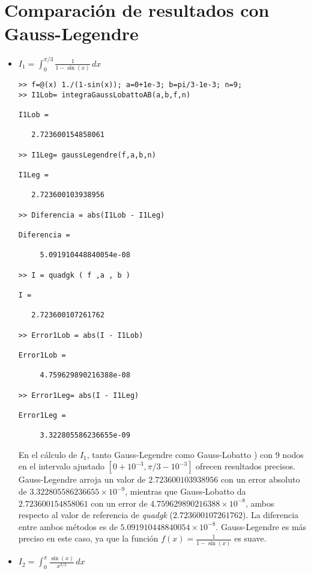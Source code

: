 \documentclass[a4paper]{article}
\begin{document}
\section{Comparación de resultados con Gauss-Legendre}
\begin{itemize}

    \item $\displaystyle I_1=\int_{0}^{\pi/3} \! \frac{1}{1-\sin(x)}  \,dx$
    \\
    \begin{lstlisting}[frame=single, style=Matlab-Pyglike]
>> f=@(x) 1./(1-sin(x)); a=0+1e-3; b=pi/3-1e-3; n=9;
>> I1Lob= integraGaussLobattoAB(a,b,f,n)

I1Lob =

   2.723600154858061

>> I1Leg= gaussLegendre(f,a,b,n)

I1Leg =

   2.723600103938956

>> Diferencia = abs(I1Lob - I1Leg)

Diferencia =

     5.091910448840054e-08

>> I = quadgk ( f ,a , b )

I =

   2.723600107261762

>> Error1Lob = abs(I - I1Lob)

Error1Lob =

     4.759629890216388e-08

>> Error1Leg= abs(I - I1Leg)

Error1Leg =

     3.322805586236655e-09

    \end{lstlisting}

En el cálculo de \( I_1 \), tanto Gauss-Legendre como Gauss-Lobatto ) con 9 nodos en el intervalo ajustado \( [0 + 10^{-3}, \pi/3 - 10^{-3}] \) ofrecen resultados precisos. Gauss-Legendre arroja un valor de \( 2.723600103938956 \) con un error absoluto de \( 3.322805586236655 \times 10^{-9} \), mientras que Gauss-Lobatto da \( 2.723600154858061 \) con un error de \( 4.759629890216388 \times 10^{-8} \), ambos respecto al valor de referencia de \textit{quadgk} (\( 2.723600107261762 \)). La diferencia entre ambos métodos es de \( 5.091910448840054 \times 10^{-8} \). Gauss-Legendre es más preciso en este caso, ya que la función \( f(x) = \frac{1}{1-\sin(x)} \) es suave.
\\
    \item $\displaystyle I_2=\int_{0}^{\pi} \! \frac{\sin(x)}{x^{3/2}}  \,dx$
    \\
    \begin{itemize}
    

\end{itemize}
\end{itemize}
\end{document}
